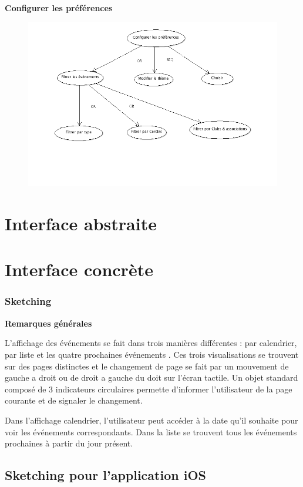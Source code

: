 \documentclass[a4paper, 11px]{article}
\begin{document}
\textbf{Configurer les préférences}
\begin{figure}[h]
\centering
\includegraphics[width = \textwidth]{configurer_preferences.png}
\end{figure}

\vfill
\clearpage
\section{Interface abstraite}
\label{abstr}

\section{Interface concrète}
\label{concrete}


\subsubsection{Sketching}
\textbf{Remarques générales}

L'affichage des événements se fait dans trois manières différentes : par calendrier, par liste et les quatre prochaines événements . Ces trois visualisations se trouvent sur des pages distinctes et le changement de page se fait par un mouvement de gauche a droit ou de droit a gauche du doit sur l'écran tactile. Un objet standard composé de 3 indicateurs circulaires permette d'informer l'utilisateur de la page courante et de signaler le changement.

Dans l'affichage calendrier, l'utilisateur peut accéder à la date qu'il souhaite pour voir les événements correspondants. Dans la liste se trouvent tous les événements prochaines à partir du jour présent.

\subsection{Sketching pour l'application iOS}
\label{sketchiOS}
\end{document}
